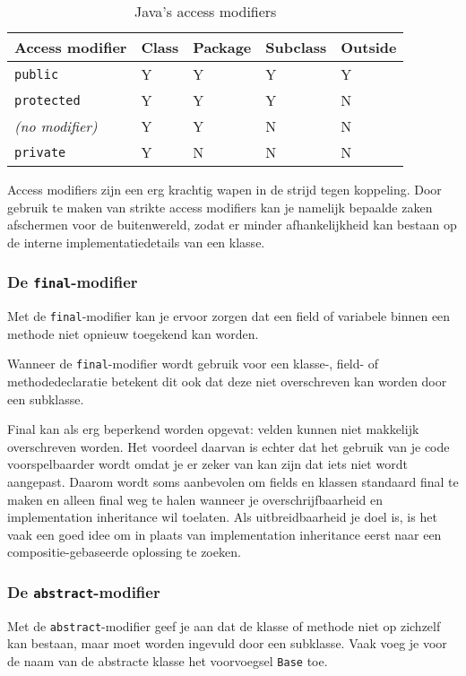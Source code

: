 \documentclass[dutch,a4paper,12pt,doubleside]{book}
\begin{document}
\begin{table}[H]
    \centering
    \begin{tabularx}{\textwidth}{
        |>{\raggedright}l|>{\raggedright}X|>{\raggedright}X|>{\raggedright}X|>{\raggedright\arraybackslash}X|
    }
    \hline
    \textbf{Access modifier} & \textbf{Class} & \textbf{Package} & \textbf{Subclass} & \textbf{Outside} \\ \hline
        \texttt{public} & Y & Y & Y & Y \\ \hline
        \texttt{protected} & Y & Y & Y & N \\ \hline
        \textit{(no modifier)} & Y & Y & N & N \\ \hline
        \texttt{private} & Y & N & N & N \\ \hline
    \end{tabularx}
    \caption{Java's access modifiers}
    \label{table:access-modifiers}
    \centering
\end{table}

Access modifiers zijn een erg krachtig wapen in de strijd tegen koppeling. 
Door gebruik te maken van 
strikte access modifiers kan je namelijk bepaalde zaken afschermen voor de buitenwereld, 
zodat er minder afhankelijkheid kan bestaan
op de interne implementatiedetails van een klasse.

\subsubsection{De \texttt{final}-modifier}
Met de \texttt{final}-modifier kan je ervoor zorgen dat 
een field of variabele binnen een methode niet opnieuw toegekend 
kan worden. 

Wanneer de \texttt{final}-modifier wordt gebruik voor een 
klasse-, field- of methodedeclaratie betekent dit ook dat deze niet 
overschreven kan worden door een subklasse.

Final kan als erg beperkend worden opgevat: velden kunnen niet makkelijk 
overschreven worden. Het voordeel daarvan is echter dat het gebruik van je code 
voorspelbaarder wordt omdat je er zeker van kan zijn dat iets niet wordt aangepast.
Daarom wordt soms aanbevolen om fields en klassen standaard 
final te maken en alleen final weg te halen wanneer je overschrijfbaarheid
en implementation inheritance wil toelaten. 
Als uitbreidbaarheid je doel is, is het vaak 
een goed idee om in plaats van implementation inheritance eerst  
naar een compositie-gebaseerde oplossing te zoeken.

\subsubsection{De \texttt{abstract}-modifier}
Met de \texttt{abstract}-modifier geef je aan dat de klasse of 
methode niet op zichzelf kan bestaan, maar moet worden ingevuld
door een subklasse. Vaak voeg je voor de naam van de abstracte klasse
het voorvoegsel \texttt{Base} toe.
\end{document}
